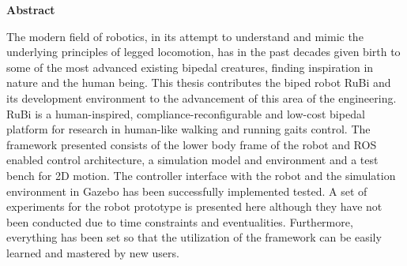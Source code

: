 \newenvironment{abstract}%
    {\null\vfill\begin{center}%
    \bfseries Abstract\end{center}}%
    {\vfill\null}
        \begin{abstract}
        The modern field of robotics, in its attempt to understand and mimic the underlying principles of legged locomotion, has in the past decades given birth to some of the most advanced existing bipedal creatures, finding inspiration in nature and the human being.
        This thesis contributes the biped robot RuBi and its development environment to the advancement of this area of the engineering.
        RuBi is a human-inspired, compliance-reconfigurable and low-cost bipedal platform for research in human-like walking and running gaits control.
        The framework presented consists of the lower body frame of the robot and ROS enabled control architecture, a simulation model and environment and a test bench for 2D motion.
        The controller interface with the robot and the simulation environment in Gazebo has been successfully implemented tested.
        A set of experiments for the robot prototype is presented here although they have not been conducted due to time constraints and eventualities.
        Furthermore, everything has been set so that the utilization of the framework can be easily learned and mastered by new users.
        \end{abstract}